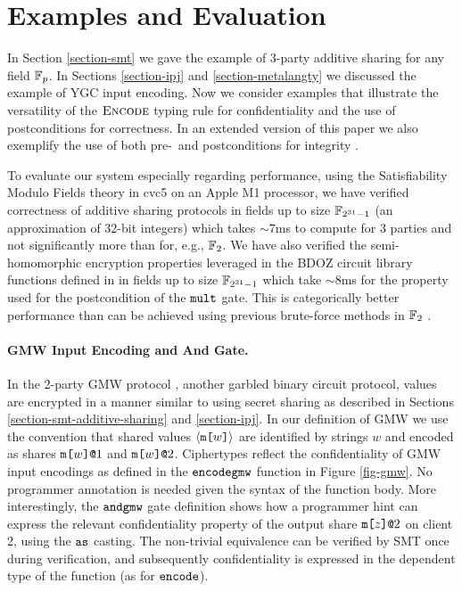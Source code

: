 \section{Examples and Evaluation}
\label{section-examples}

In Section \ref{section-smt} we gave the example of 3-party additive
sharing for any field $\mathbb{F}_{p}$. In Sections \ref{section-ipj} and
\ref{section-metalangty} we discussed the example of YGC input encoding.
Now we consider examples that illustrate the versatility of the
$\text{\sc Encode}$ typing rule for confidentiality and the use of
postconditions for correctness. In an extended version of this paper
we also exemplify the use of both pre-~and
postconditions for integrity \cite{skalka2025smtboostedsecuritytypeslowlevel}.

To evaluate our system especially regarding performance, using the
Satisfiability Modulo Fields theory in cvc5 on an Apple M1 processor,
we have verified correctness of additive sharing protocols in fields
up to size $\mathbb{F}_{2^{31} - 1}$ (an approximation of 32-bit integers)
which takes $\sim$7ms to compute for 3 parties and not significantly more
than for, e.g., $\mathbb{F}_{2}$. We have also verified the semi-homomorphic
encryption properties leveraged in the BDOZ circuit library functions
defined in \cite{skalka2025smtboostedsecuritytypeslowlevel} in fields up to
size $\mathbb{F}_{2^{31} - 1}$ which take $\sim$8ms for the property used for
the postcondition of the $\texttt{mult}$ gate. This is categorically
better performance than can be achieved using previous brute-force
methods in $\mathbb{F}_{2}$ \cite{skalka-near-ppdp24}.



\paragraph{GMW Input Encoding and And Gate.}
In the 2-party GMW protocol \cite{evans2018pragmatic}, another garbled
binary circuit protocol, values are encrypted in a manner similar to
using secret sharing as described in Sections
\ref{section-smt-additive-sharing} and \ref{section-ipj}. In our
definition of GMW we use the convention that shared values
$\langle \texttt{m[}w\texttt{]} \rangle$ are identified by strings $w$ and encoded as shares
$\texttt{m[}w\texttt{]}\texttt{@}1$ and $\texttt{m[}w\texttt{]}\texttt{@}2$.  Ciphertypes reflect the
confidentiality of GMW input encodings as defined in the
$\texttt{encodegmw}$ function in Figure \ref{fig-gmw}. No programmer
annotation is needed given the syntax of the function body. More
interestingly, the $\texttt{andgmw}$ gate definition shows how a
programmer hint can express the relevant confidentiality property of
the output share $\texttt{m[}z\texttt{]}\texttt{@}2$ on client 2, using the $\texttt{as}$
casting. The non-trivial equivalence can be verified by SMT once
during verification, and subsequently confidentiality is expressed in
the dependent type of the function (as for $\texttt{encode}$).

